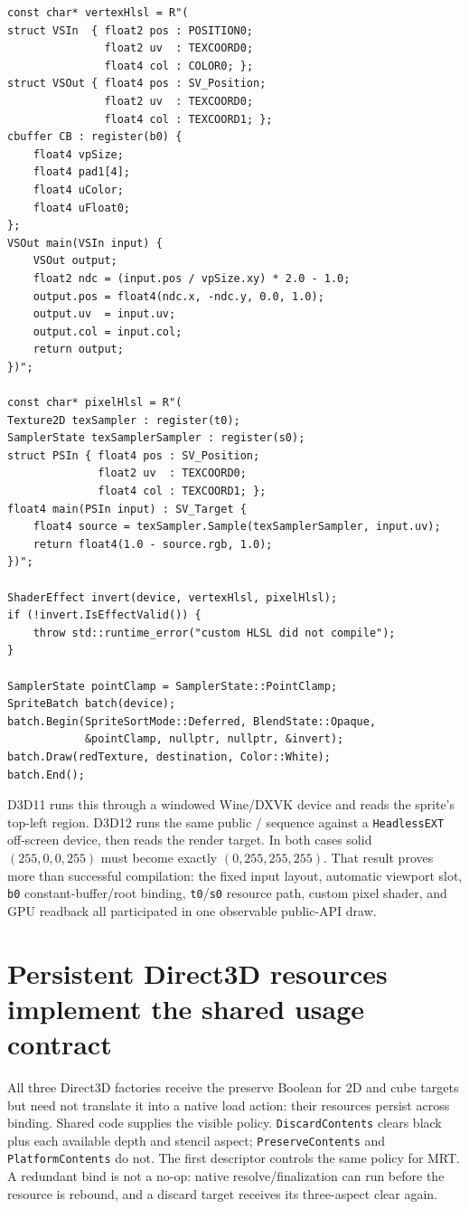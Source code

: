 \begin{lstlisting}
const char* vertexHlsl = R"(
struct VSIn  { float2 pos : POSITION0;
               float2 uv  : TEXCOORD0;
               float4 col : COLOR0; };
struct VSOut { float4 pos : SV_Position;
               float2 uv  : TEXCOORD0;
               float4 col : TEXCOORD1; };
cbuffer CB : register(b0) {
    float4 vpSize;
    float4 pad1[4];
    float4 uColor;
    float4 uFloat0;
};
VSOut main(VSIn input) {
    VSOut output;
    float2 ndc = (input.pos / vpSize.xy) * 2.0 - 1.0;
    output.pos = float4(ndc.x, -ndc.y, 0.0, 1.0);
    output.uv  = input.uv;
    output.col = input.col;
    return output;
})";

const char* pixelHlsl = R"(
Texture2D texSampler : register(t0);
SamplerState texSamplerSampler : register(s0);
struct PSIn { float4 pos : SV_Position;
              float2 uv  : TEXCOORD0;
              float4 col : TEXCOORD1; };
float4 main(PSIn input) : SV_Target {
    float4 source = texSampler.Sample(texSamplerSampler, input.uv);
    return float4(1.0 - source.rgb, 1.0);
})";

ShaderEffect invert(device, vertexHlsl, pixelHlsl);
if (!invert.IsEffectValid()) {
    throw std::runtime_error("custom HLSL did not compile");
}

SamplerState pointClamp = SamplerState::PointClamp;
SpriteBatch batch(device);
batch.Begin(SpriteSortMode::Deferred, BlendState::Opaque,
            &pointClamp, nullptr, nullptr, &invert);
batch.Draw(redTexture, destination, Color::White);
batch.End();
\end{lstlisting}

D3D11 runs this through a windowed Wine/DXVK device and reads the sprite's top-left region.
D3D12 runs the same public / sequence against a
\texttt{HeadlessEXT} off-screen device, then reads the render target. In both cases solid
\((255,0,0,255)\) must become exactly \((0,255,255,255)\). That result proves more than
successful compilation: the fixed input layout, automatic viewport slot, \texttt{b0}
constant-buffer/root binding, \texttt{t0}/\texttt{s0} resource path, custom pixel shader, and
GPU readback all participated in one observable public-API draw.

\section{Persistent Direct3D resources implement the shared usage contract}

All three Direct3D factories receive the preserve Boolean for 2D and cube targets but need not
translate it into a native load action: their resources persist across binding. Shared code
supplies the visible policy. \texttt{DiscardContents} clears black plus each available depth
and stencil aspect; \texttt{PreserveContents} and \texttt{PlatformContents} do not. The first
descriptor controls the same policy for MRT. A redundant bind is not a no-op: native
resolve/finalization can run before the resource is rebound, and a discard target receives its
three-aspect clear again.

